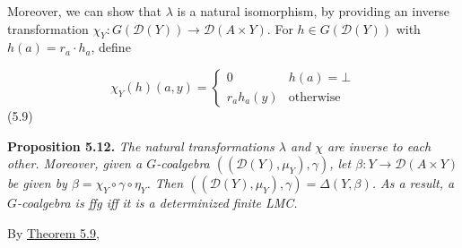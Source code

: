 \documentclass[11pt,a4paper]{amsart}
\begin{document}
\par\medskip
\hypertarget{html:S5.SS0.SSS0.Px2.p4}{} Moreover, we can show that %
\hypertarget{html:S5.SS0.SSS0.Px2.p4.m1}{}\({\lambda}\) is a natural isomorphism, by providing an inverse transformation %
\hypertarget{html:S5.SS0.SSS0.Px2.p4.m2}{}\({\chi_{Y}:G({\mathcal{D}}(Y))\to{\mathcal{D}}(A\times Y)}\). For %
\hypertarget{html:S5.SS0.SSS0.Px2.p4.m3}{}\({h\in G({\mathcal{D}}(Y))}\) with %
\hypertarget{html:S5.SS0.SSS0.Px2.p4.m4}{}\({h(a)=r_{a}\cdot h_{a}}\), define
\par\medskip
\hypertarget{html:S5.E9}{}   %
\hypertarget{html:S5.E9.m1}{}\[\chi_{Y}(h)(a,y)=\begin{cases}0&h(a)=\bot\\
r_{a}h_{a}(y)&\text{otherwise}\end{cases}\]  (5.9)    %
\hypertarget{html:S5.Thmtheorem12}{} \par\noindent\textbf{\textbf{Proposition 5.12}\textbf{.}}\quad  %
\hypertarget{html:S5.Thmtheorem12.p1}{} \emph{The natural transformations %
\hypertarget{html:S5.Thmtheorem12.p1.m1}{}\({\lambda}\) and %
\hypertarget{html:S5.Thmtheorem12.p1.m2}{}\({\chi}\) are inverse to each other. Moreover, given a %
\hypertarget{html:S5.Thmtheorem12.p1.m3}{}\({G}\)-coalgebra %
\hypertarget{html:S5.Thmtheorem12.p1.m4}{}\({(({\mathcal{D}}(Y),\mu_{Y}),\gamma)}\), let %
\hypertarget{html:S5.Thmtheorem12.p1.m5}{}\({\beta:Y\to{\mathcal{D}}(A\times Y)}\) be given by %
\hypertarget{html:S5.Thmtheorem12.p1.m6}{}\({\beta=\chi_{Y}\circ\gamma\circ\eta_{Y}}\). Then %
\hypertarget{html:S5.Thmtheorem12.p1.m7}{}\({(({\mathcal{D}}(Y),\mu_{Y}),\gamma)=\Delta(Y,\beta)}\). As a result, a %
\hypertarget{html:S5.Thmtheorem12.p1.m8}{}\({G}\)-coalgebra is ffg iff it is a determinized finite LMC.}
\par\medskip
\hypertarget{html:S5.SS0.SSS0.Px2.p5}{} By \hyperlink{html:S5.Thmtheorem9}{Theorem 5.9}, %
\end{document}
